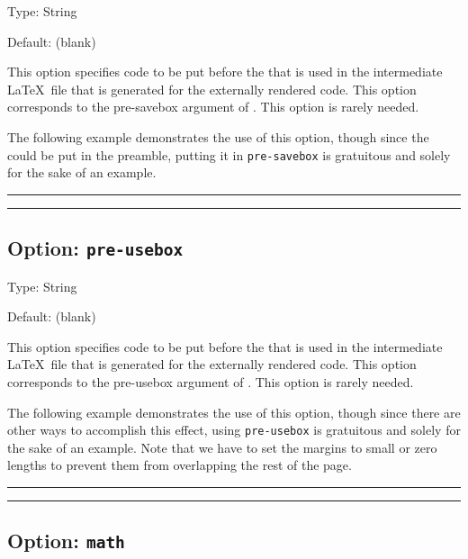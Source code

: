 \documentclass[10pt]{ltxdoc}
\newcommand{\opt}[1]{\texttt{#1}}
\def\sz{%
  \rule{0.2em}{7pt}%
  \llap{\rule[8pt]{0.2em}{2pt}}%
}
\begin{document}
Type: String

Default: (blank)

This option specifies code to be put before the  that is
used in the intermediate \LaTeX\ file that is generated for the
externally rendered code.
This option corresponds to the pre-savebox argument of
.
This option is rarely needed.

The following example demonstrates the use of this option, though since
the  could be put in the preamble, putting it in
\opt{pre-savebox} is gratuitous and solely for the sake of an example.

\begin{tcblisting}{}
\sz{}\sz
\end{tcblisting}

\subsection{Option: \opt{pre-usebox}}
\label{subsec:pre-usebox}

Type: String

Default: (blank)

This option specifies code to be put before the  that is
used in the intermediate \LaTeX\ file that is generated for the
externally rendered code.
This option corresponds to the pre-usebox argument of
.
This option is rarely needed.

The following example demonstrates the use of this option, though since
there are other ways to accomplish this effect, using \opt{pre-usebox}
is gratuitous and solely for the sake of an example.
Note that we have to set the margins to small or zero lengths to
prevent them from overlapping the rest of the page.

\begin{tcblisting}{}
\sz
{}%
\sz
\end{tcblisting}

\subsection{Option: \opt{math}}
\label{subsec:math}
\end{document}
